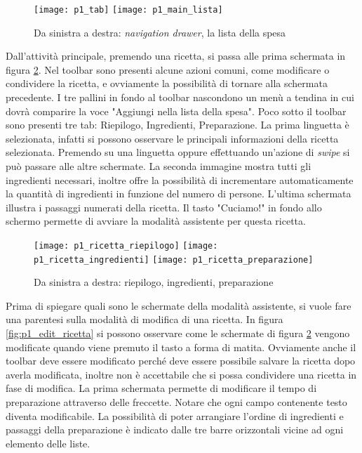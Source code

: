 \begin{figure}[ht]
  \begin{center}
    \texttt{[image: p1\_tab]}
    \texttt{[image: p1\_main\_lista]}
    \caption{Da sinistra a destra: \textit{navigation drawer}, la lista della spesa}
    \label{fig:p1_lista_spesa}
  \end{center}
\end{figure}


\clearpage
Dall'attività principale, premendo una ricetta, si passa alle prima schermata in figura \ref{fig:p1_ricetta}.
Nel toolbar sono presenti alcune azioni comuni, come modificare o condividere la ricetta, e ovviamente la possibilità di tornare alla schermata precedente.
I tre pallini in fondo al toolbar nascondono un menù a tendina in cui dovrà comparire la voce "Aggiungi nella lista della spesa".
Poco sotto il toolbar sono presenti tre tab: Riepilogo, Ingredienti, Preparazione.
La prima linguetta è selezionata, infatti si possono osservare le principali informazioni della ricetta selezionata.
Premendo su una linguetta oppure effettuando un'azione di \textit{swipe} si può passare alle altre schermate.
La seconda immagine mostra tutti gli ingredienti necessari, inoltre offre la possibilità di incrementare automaticamente la quantità di ingredienti in funzione del numero di persone.
L'ultima schermata illustra i passaggi numerati della ricetta.
Il tasto "Cuciamo!" in fondo allo schermo permette di avviare la modalità assistente per questa ricetta.

\begin{figure}[ht]
  \begin{center}
    \texttt{[image: p1\_ricetta\_riepilogo]}
    \texttt{[image: p1\_ricetta\_ingredienti]}
    \texttt{[image: p1\_ricetta\_preparazione]}
    \caption{Da sinistra a destra: riepilogo, ingredienti, preparazione}
    \label{fig:p1_ricetta}
  \end{center}
\end{figure}

Prima di spiegare quali sono le schermate della modalità assistente, si vuole fare una parentesi sulla modalità di modifica di una ricetta.
In figura \ref{fig:p1_edit_ricetta} si possono osservare come le schermate di figura \ref{fig:p1_ricetta} vengono modificate quando viene premuto il tasto a forma di matita.
Ovviamente anche il toolbar deve essere modificato perché deve essere possibile salvare la ricetta dopo averla modificata, inoltre non è accettabile che si possa condividere una ricetta in fase di modifica.
La prima schermata permette di modificare il tempo di preparazione attraverso delle freccette.
Notare che ogni campo contenente testo diventa modificabile.
La possibilità di poter arrangiare l'ordine di ingredienti e passaggi della preparazione è indicato dalle tre barre orizzontali vicine ad ogni elemento delle liste.

